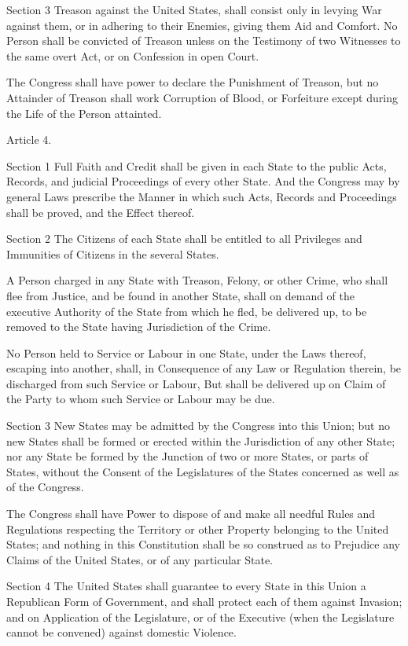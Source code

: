 \documentclass{article}
\begin{document}
Section 3
Treason against the United States, shall consist only in levying War against
them, or in adhering to their Enemies, giving them Aid and Comfort. No Person
shall be convicted of Treason unless on the Testimony of two Witnesses to the
same overt Act, or on Confession in open Court.

The Congress shall have power to declare the Punishment of Treason, but no
Attainder of Treason shall work Corruption of Blood, or Forfeiture except
during the Life of the Person attainted.

Article 4.

Section 1
Full Faith and Credit shall be given in each State to the public Acts, Records,
and judicial Proceedings of every other State. And the Congress may by general
Laws prescribe the Manner in which such Acts, Records and Proceedings shall be
proved, and the Effect thereof.

Section 2
The Citizens of each State shall be entitled to all Privileges and Immunities
of Citizens in the several States.

A Person charged in any State with Treason, Felony, or other Crime, who shall
flee from Justice, and be found in another State, shall on demand of the
executive Authority of the State from which he fled, be delivered up, to be
removed to the State having Jurisdiction of the Crime.

No Person held to Service or Labour in one State, under the Laws thereof,
escaping into another, shall, in Consequence of any Law or Regulation therein,
be discharged from such Service or Labour, But shall be delivered up on Claim
of the Party to whom such Service or Labour may be due.

Section 3
New States may be admitted by the Congress into this Union; but no new States
shall be formed or erected within the Jurisdiction of any other State; nor any
State be formed by the Junction of two or more States, or parts of States,
without the Consent of the Legislatures of the States concerned as well as of
the Congress.

The Congress shall have Power to dispose of and make all needful Rules and
Regulations respecting the Territory or other Property belonging to the United
States; and nothing in this Constitution shall be so construed as to Prejudice
any Claims of the United States, or of any particular State.

Section 4
The United States shall guarantee to every State in this Union a Republican
Form of Government, and shall protect each of them against Invasion; and on
Application of the Legislature, or of the Executive (when the Legislature
cannot be convened) against domestic Violence.
\end{document}
